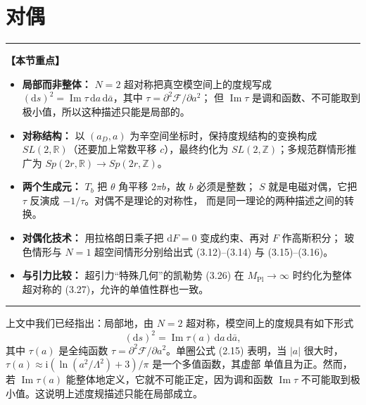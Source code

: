 \documentclass[11pt,a4paper,UTF8,fontset=fandol]{ctexart}
\theoremstyle{plain}
\theoremstyle{definition}
\newenvironment{keypoints}{%
  \par\addvspace{0.9em}%
  \noindent\begin{minipage}{\linewidth}%
  \color{black!80}\rule{\linewidth}{0.6pt}\par\vspace{2pt}%
  \noindent\textbf{【本节重点】}\par\vspace{2pt}%
  \begin{itemize}[leftmargin=1.6em,itemsep=1pt,topsep=2pt,parsep=0pt]%
}{%
  \end{itemize}\vspace{1pt}\noindent\color{black!80}\rule{\linewidth}{0.6pt}%
  \end{minipage}\par\addvspace{0.9em}%
}
\newcommand{\R}{\mathbb{R}}
\newcommand{\Z}{\mathbb{Z}}
\newcommand{\dd}{\mathrm{d}}
\newcommand{\ii}{\mathrm{i}}
\renewcommand{\Im}{\operatorname{Im}}
\newcommand{\Nc}{\mathcal{N}}
\newcommand{\Ff}{\mathcal{F}}
\def\Nc{N}%
\begin{document}
\section{对偶}
\begin{keypoints}
  \item \textbf{局部而非整体：} $\Nc=2$ 超对称把真空模空间上的度规写成
        $(\dd s)^2=\Im\tau\,\dd a\,\dd\bar a$，其中 $\tau=\partial^2\Ff/\partial a^2$；
        但 $\Im\tau$ 是调和函数、不可能取到极小值，所以这种描述只能是局部的。
  \item \textbf{对称结构：} 以 $(a_D,a)$ 为辛空间坐标时，保持度规结构的变换构成
        $SL(2,\R)$（还要加上常数平移 $c$），最终约化为 $SL(2,\Z)$；多规范群情形推广为
        $Sp(2r,\R)\to Sp(2r,\Z)$。
  \item \textbf{两个生成元：} $T_b$ 把 $\theta$ 角平移 $2\pi b$，故 $b$ 必须是整数；
        $S$ 就是电磁对偶，它把 $\tau$ 反演成 $-1/\tau$。对偶不是理论的对称性，
        而是同一理论的两种描述之间的转换。
  \item \textbf{对偶化技术：} 用拉格朗日乘子把 $\dd F=0$ 变成约束、再对 $F$ 作高斯积分；
        玻色情形与 $\Nc=1$ 超空间情形分别给出式 (3.12)--(3.14) 与 (3.15)--(3.16)。
  \item \textbf{与引力比较：} 超引力“特殊几何”的凯勒势 (3.26) 在
        $M_{\mathrm{Pl}}\to\infty$ 时约化为整体超对称的 (3.27)，允许的单值性群也一致。
\end{keypoints}

上文中我们已经指出：局部地，由 $\Nc=2$ 超对称，模空间上的度规具有如下形式
\begin{equation}
  (\dd s)^2=\Im\tau(a)\,\dd a\,\dd\bar a, \tag{3.1}
\end{equation}
其中 $\tau(a)$ 是全纯函数 $\tau=\partial^2\Ff/\partial a^2$。单圈公式 (2.15) 表明，当 $|a|$
很大时，$\tau(a)\approx\ii\left(\ln(a^2/\Lambda^2)+3\right)/\pi$ 是一个多值函数，其虚部
单值且为正。然而，若 $\Im\tau(a)$ 能整体地定义，它就不可能正定，因为调和函数 $\Im\tau$
不可能取到极小值。这说明上述度规描述只能在局部成立。
\end{document}
